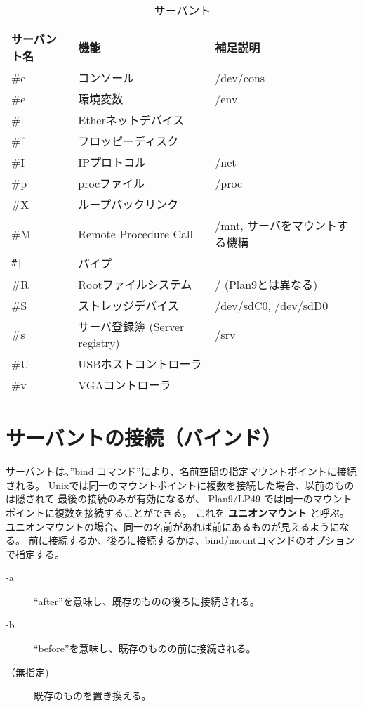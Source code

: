 \begin{table}[htb]
\caption[Servants]{サーバント}
\label{table:Servants}
\begin{center}
{\small 
\begin{tabular}{|l|l|l|}
\hline
 サーバント名  &   機能    &   補足説明 \\
\hline
      \#c    &    コンソール             &  /dev/cons \\
      \#e    &    環境変数               & /env \\
      \#l    &    Etherネットデバイス    & \\
      \#f    &    フロッピーディスク     & \\                      
      \#I    &    IPプロトコル           & /net \\
      \#p    &    procファイル           & /proc \\
      \#X    &    ループバックリンク         & \\
      \#M    &    Remote Procedure Call      & /mnt, サーバをマウントする機構 \\
      \verb:#|:  &  パイプ                   &  \\
      \#R    &    Rootファイルシステム       & / (Plan9とは異なる)\\                  
      \#S    &    ストレッジデバイス                & /dev/sdC0, /dev/sdD0\\
      \#s    &    サーバ登録簿 (Server registry)    & /srv \\          
      \#U    &    USBホストコントローラ              & \\          
      \#v    &    VGAコントローラ                    & \\          
\hline
\end{tabular}
}
\end{center}
\end{table}

    
    
\section{サーバントの接続（バインド）}

   サーバントは、''bind コマンド''により、名前空間の指定マウントポイントに接続される。
   Unixでは同一のマウントポイントに複数を接続した場合、以前のものは隠されて
   最後の接続のみが有効になるが、
   Plan9/LP49 では同一のマウントポイントに複数を接続することができる。
   これを {\bf ユニオンマウント} と呼ぶ。
   ユニオンマウントの場合、同一の名前があれば前にあるものが見えるようになる。
   前に接続するか、後ろに接続するかは、bind/mountコマンドのオプションで指定する。
   \begin{description}
   \item[-a] ``after''を意味し、既存のものの後ろに接続される。 
   \item[-b] ``before''を意味し、既存のものの前に接続される。 
   \item[（無指定) ] 既存のものを置き換える。
   \end{description}

